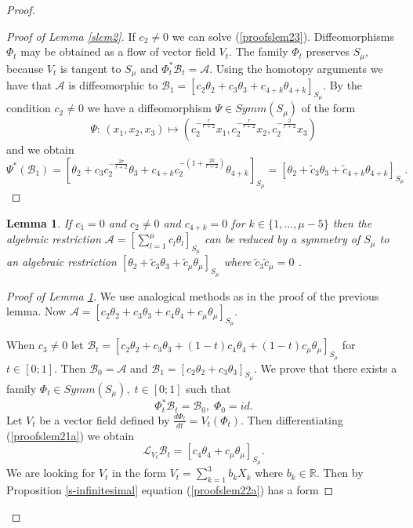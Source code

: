 \documentclass{amsart}
\newtheorem{lem}[thm]{Lemma}
\theoremstyle{definition}
\numberwithin{equation}{section}
\begin{document}
\begin{proof}
\begin{proof}[Proof of Lemma \ref{slem2}]
\noindent If \;$ c_2\ne 0$ we can solve (\ref{proofslem23}).
  Diffeomorphisms $\Phi_t$ may be obtained as a flow of vector field $V_t$.
The family $\Phi_t$ preserves $S_{\mu}$, because $V_t$ is tangent to $S_{\mu}$ and $\Phi_t^*\mathcal{B}_t=\mathcal{A}$.
Using the homotopy arguments we have that $\mathcal{A}$ is diffeomorphic to $ \mathcal{B}_1=[c_2 \theta_2+c_3 \theta_3+c_{4+k} \theta_{4+k}]_{S_{\mu}}$.
By the condition $c_2\ne 0$ we have a diffeomorphism $\Psi \in Symm(S_{\mu})$ of the form
  \begin{equation}
\label{proofslem24}
\Psi:\,(x_1,x_2,x_3)\mapsto (c_2^{-\frac{r}{r+2}} x_1,c_2^{-\frac{r}{r+2}} x_2,c_2^{-\frac{2}{r+2}} x_3)
\end{equation}
and we obtain
\[ \Psi^*(\mathcal{B}_1)=[\theta_2+ c_3 c_2^{-\frac{2r}{r+2}}\theta_3+c_{4+k} c_2^{-(1+\frac{2k}{r+2})} \theta_{4+k}]_{S_{\mu}} =
 [ \theta_2+ \widetilde{c}_3\theta_3+\widetilde{c}_{4+k} \theta_{4+k}]_{S_{\mu}}.\]

 \end{proof}

\begin{lem}
\label{slem2a} If \;$c_1= 0$\; and \;$c_2\neq 0$\; and $c_{4+k}=0$ for $k\in \{1,...,\mu-5\}$ then the algebraic restriction $\mathcal{A}=[ \sum_{l=1}^{\mu}c_{l} \theta_{l}]_{S_{\mu}}$ can be reduced by a symmetry of $S_{\mu}$ to an algebraic restriction $[\theta_2+ \widetilde{c}_3\theta_3+ \widetilde{c}_{\mu} \theta_{\mu}]_{S_{\mu}}$ where $\widetilde{c}_3 \widetilde{c}_{\mu}=0$ .
\end{lem}

\begin{proof}[Proof of Lemma \ref{slem2a}]
We use analogical methods as in the proof of the previous lemma. Now
$\mathcal{A}= [c_2 \theta_2+c_3 \theta_3+c_4 \theta_4+ c_{\mu}\theta_{\mu}]_{S_{\mu}}$. \par \noindent  When $c_3\ne 0$ let $\mathcal{B}_t=[c_2 \theta_2+c_3 \theta_3+(1-t)c_4 \theta_4+(1-t)c_{\mu} \theta_{\mu}]_{S_{\mu}}$ \; for $t \in[0;1]$. Then $\mathcal{B}_0=\mathcal{A}$\; and
\;$\mathcal{B}_1=[c_2 \theta_2+c_3 \theta_3]_{S_{\mu}}$.
 We prove that there exists a family $\Phi_t \in Symm(S_{\mu}),\;t\in [0;1]$ such that
 \begin{equation}
\label{proofslem21a}   \Phi_t^*\mathcal{B}_t=\mathcal{B}_0,\;\Phi_0=id.
\end{equation}
Let $V_t$ be a vector field defined by $\frac{d \Phi_t}{dt}=V_t(\Phi_t)$. Then differentiating (\ref{proofslem21a}) we obtain
  \begin{equation}
\label{proofslem22a}   \mathcal L_{V_t} \mathcal{B}_t=[c_4 \theta_4+{c}_{\mu} \theta_{\mu}]_{S_{\mu}}.
\end{equation}
We are looking for $V_t$ in the form $V_t=\sum_{k=1}^{3}b_k X_k$   where $b_k\in \mathbb{R}$.  Then by Proposition  \ref{s-infinitesimal} equation (\ref{proofslem22a})
has a form


\end{proof}
\end{proof}
\end{document}
